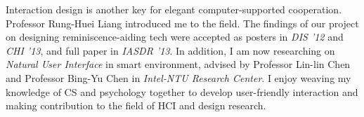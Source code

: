 \noindent 
Interaction design is another key for elegant computer-supported cooperation. 
Professor Rung-Huei Liang introduced me to the field.
The findings of our project on designing reminiscence-aiding tech were accepted as posters in \textit{DIS '12} and \textit{CHI '13}, 
and full paper in \textit{IASDR '13}.
In addition, I am now researching on \textit{Natural User Interface} in smart environment,
advised by Professor Lin-lin Chen and Professor Bing-Yu Chen in \textit{Intel-NTU Research Center}.
I enjoy weaving my knowledge of CS and psychology together to develop user-friendly interaction 
and making contribution to the field of HCI and design research.\\

%

